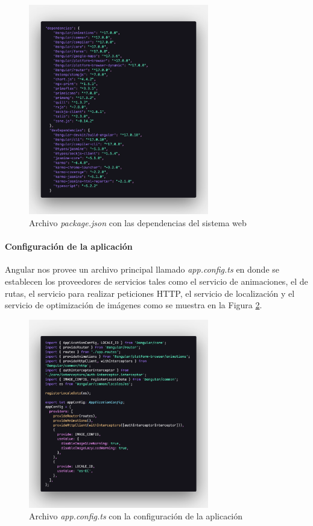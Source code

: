 \begin{figure}[H]
    \centering
    \includegraphics[width=0.7\textwidth]{resources/images/dependencias-angular}
    \caption{Archivo \textit{package.json} con las dependencias del sistema web}
    \label{fig:package-json}
\end{figure}

\paragraph{Configuración de la aplicación}

Angular nos provee un archivo principal llamado \textit{app.config.ts} en donde se establecen los proveedores de servicios tales como el servicio de animaciones, el de rutas, el servicio para realizar peticiones HTTP, el servicio de localización y el servicio de optimización de imágenes como se muestra en la Figura \ref{fig:app-config}.

\begin{figure}[H]
    \centering
    \includegraphics[width=0.7\textwidth]{resources/images/app-config}
    \caption{Archivo \textit{app.config.ts} con la configuración de la aplicación}
    \label{fig:app-config}
\end{figure}

